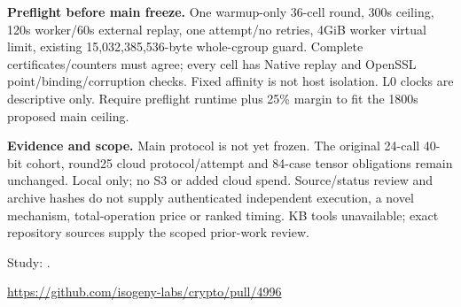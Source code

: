 \documentclass[10pt]{article}
\begin{document}
\textbf{Preflight before main freeze.} One warmup-only 36-cell round, 300s ceiling,
120s worker/60s external replay, one attempt/no retries, 4GiB worker virtual limit,
existing 15,032,385,536-byte whole-cgroup guard. Complete certificates/counters
must agree; every cell has Native replay and OpenSSL point/binding/corruption
checks. Fixed affinity is not host isolation. L0 clocks are descriptive only.
Require preflight runtime plus 25\% margin to fit the 1800s proposed main ceiling.

\textbf{Evidence and scope.} Main protocol is not yet frozen. The original
24-call 40-bit cohort, round25 cloud protocol/attempt and 84-case tensor obligations
remain unchanged. Local only; no S3 or added cloud spend. Source/status review
and archive hashes do not supply authenticated independent execution, a novel
mechanism, total-operation price or ranked timing. KB tools unavailable; exact
repository sources supply the scoped prior-work review.

\small Study: .\par
\url{https://github.com/isogeny-labs/crypto/pull/4996}
\end{document}
